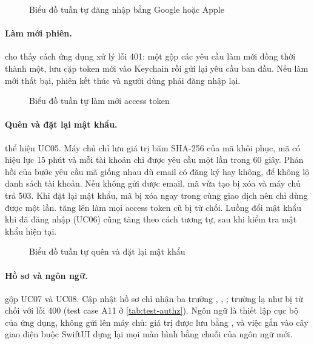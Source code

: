 \begin{figure}[H]
\centering
{}
\caption{Biểu đồ tuần tự đăng nhập bằng Google hoặc Apple}\label{fig:seq-social}
\end{figure}

\paragraph{Làm mới phiên.}  cho thấy cách ứng dụng xử lý lỗi 401: một  gộp các yêu cầu làm mới đồng thời thành một, lưu cặp token mới vào Keychain rồi gửi lại yêu cầu ban đầu. Nếu làm mới thất bại, phiên kết thúc và người dùng phải đăng nhập lại.

\begin{figure}[H]
\centering
{}
\caption{Biểu đồ tuần tự làm mới access token}\label{fig:seq-refresh}
\end{figure}


\paragraph{Quên và đặt lại mật khẩu.}  thể hiện UC05. Máy chủ chỉ lưu giá trị băm SHA-256 của mã khôi phục, mã có hiệu lực 15 phút và mỗi tài khoản chỉ được yêu cầu một lần trong 60 giây. Phản hồi của bước yêu cầu mã giống nhau dù email có đăng ký hay không, để không lộ danh sách tài khoản. Nếu không gửi được email, mã vừa tạo bị xóa và máy chủ trả 503. Khi đặt lại mật khẩu, mã bị xóa ngay trong cùng giao dịch nên chỉ dùng được một lần.  tăng lên làm mọi access token cũ bị  từ chối. Luồng đổi mật khẩu khi đã đăng nhập (UC06) cũng tăng  theo cách tương tự, sau khi kiểm tra mật khẩu hiện tại.

\begin{figure}[H]
\centering
{}
\caption{Biểu đồ tuần tự quên và đặt lại mật khẩu}\label{fig:seq-password}
\end{figure}

\paragraph{Hồ sơ và ngôn ngữ.}  gộp UC07 và UC08. Cập nhật hồ sơ chỉ nhận ba trường , , ; trường lạ như  bị  từ chối với lỗi 400 (test case A11 ở \cref{tab:test-authz}). Ngôn ngữ là thiết lập cục bộ của ứng dụng, không gửi lên máy chủ: giá trị được lưu bằng , và việc gắn  vào cây giao diện buộc SwiftUI dựng lại mọi màn hình bằng chuỗi của ngôn ngữ mới.


